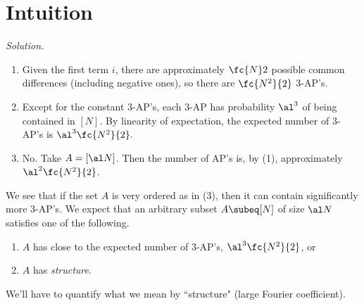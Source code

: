 \section{Intuition}

\vskip0.15in
{\it Solution.}
\begin{enumerate}
\item
Given the first term $i$, there are approximately $\fc{N}2$ possible common differences (including negative ones), so there are $\fc{N^2}{2}$ 3-AP's.
\item Except for the constant 3-AP's, each 3-AP has probability $\al^3$ of being contained in $[N]$. By linearity of expectation, the expected number of 3-AP's is
$
\al^3\fc{N^2}{2}.
$
\item No. Take $A=[\al N]$. Then the number of AP's is, by (1), approximately $\al^2\fc{N^2}{2}$.
\end{enumerate}
We see that if the set $A$ is very ordered as in (3), then it can contain significantly more 3-AP's. We expect that an arbitrary subset $A\subeq [N]$ of size $\al N$ 
satisfies one of the following.
\begin{enumerate}
\item
$A$ has close to the expected number of 3-AP's, $\al^3\fc {N^2}{2}$, or
\item
$A$ has {\it structure}.
\end{enumerate}
We'll have to quantify what we mean by ``structure" (large Fourier coefficient).

